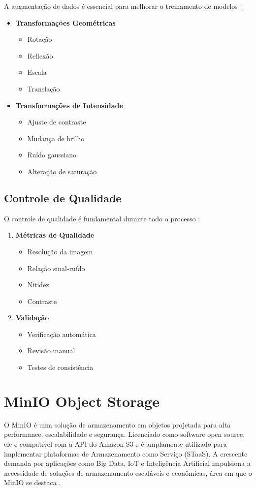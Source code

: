 A augmentação de dados é essencial para melhorar o treinamento de modelos \cite{zhang2023augmentation}:

\begin{itemize}
\item \textbf{Transformações Geométricas}
\begin{itemize}
\item Rotação
\item Reflexão
\item Escala
\item Translação
\end{itemize}

\item \textbf{Transformações de Intensidade}
\begin{itemize}
    \item Ajuste de contraste
    \item Mudança de brilho
    \item Ruído gaussiano
    \item Alteração de saturação
\end{itemize}
\end{itemize}

\subsection{Controle de Qualidade}

O controle de qualidade é fundamental durante todo o processo \cite{chen2023quality}:

\begin{enumerate}
\item \textbf{Métricas de Qualidade}
\begin{itemize}
\item Resolução da imagem
\item Relação sinal-ruído
\item Nitidez
\item Contraste
\end{itemize}

\item \textbf{Validação}
\begin{itemize}
    \item Verificação automática
    \item Revisão manual
    \item Testes de consistência
\end{itemize}
\end{enumerate}


\section{MinIO Object Storage}
O MinIO é uma solução de armazenamento em objetos projetada para alta performance, escalabilidade e segurança. Licenciado como 
software open source, ele é compatível com a API do Amazon S3 e é amplamente utilizado para implementar plataformas de Armazenamento 
como Serviço (STaaS). A crescente demanda por aplicações como Big Data, IoT e Inteligência Artificial impulsiona a necessidade de 
soluções de armazenamento escaláveis e econômicas, área em que o MinIO se destaca \cite{minio_reference_architecture}. 

